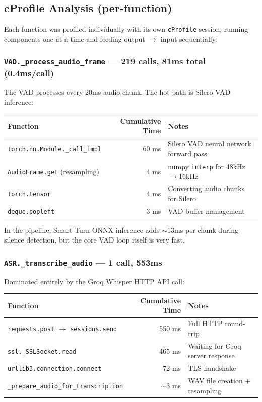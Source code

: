 \subsection{cProfile Analysis (per-function)}

Each function was profiled individually with its own \texttt{cProfile} session, running components one at a time and feeding output $\rightarrow$ input sequentially.

\subsubsection{\texttt{VAD.\_process\_audio\_frame} --- 219 calls, 81ms total (0.4ms/call)}

The VAD processes every 20ms audio chunk. The hot path is Silero VAD inference:

\begin{table}[h]
\centering
\begin{tabular}{|l|r|l|}
\hline
\textbf{Function} & \textbf{Cumulative Time} & \textbf{Notes} \\
\hline
\texttt{torch.nn.Module.\_call\_impl} & 60 ms & Silero VAD neural network forward pass \\
\texttt{AudioFrame.get} (resampling) & 4 ms & numpy \texttt{interp} for 48kHz$\rightarrow$16kHz \\
\texttt{torch.tensor} & 4 ms & Converting audio chunks for Silero \\
\texttt{deque.popleft} & 3 ms & VAD buffer management \\
\hline
\end{tabular}
\end{table}

In the pipeline, Smart Turn ONNX inference adds $\sim$13ms per chunk during silence detection, but the core VAD loop itself is very fast.

\subsubsection{\texttt{ASR.\_transcribe\_audio} --- 1 call, 553ms}

Dominated entirely by the Groq Whisper HTTP API call:

\begin{table}[h]
\centering
\begin{tabular}{|l|r|l|}
\hline
\textbf{Function} & \textbf{Cumulative Time} & \textbf{Notes} \\
\hline
\texttt{requests.post} $\rightarrow$ \texttt{sessions.send} & 550 ms & Full HTTP round-trip \\
\texttt{ssl.\_SSLSocket.read} & 465 ms & Waiting for Groq server response \\
\texttt{urllib3.connection.connect} & 72 ms & TLS handshake \\
\texttt{\_prepare\_audio\_for\_transcription} & $\sim$3 ms & WAV file creation + resampling \\
\hline
\end{tabular}
\end{table}

